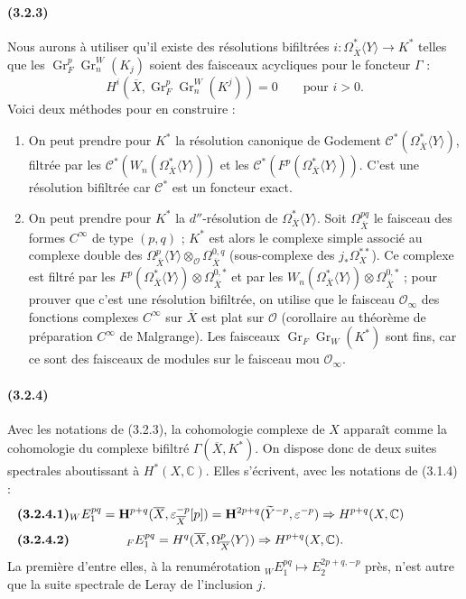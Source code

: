 \documentclass[10pt]{article}
\newcommand{\C}{\mathbb C}
\newcommand{\Gr}{\operatorname{Gr}}
\begin{document}
\paragraph{(3.2.3)} Nous aurons à utiliser qu'il existe des résolutions bifiltrées $i:\Omega_{\overline X}^{*}\langle Y\rangle\longrightarrow K^*$ telles que les $\Gr_F^p\Gr_n^W(K_j)$ soient des faisceaux acycliques pour le foncteur $\Gamma$ :
\[
H^i(\overline X,\Gr_F^p\Gr_n^W(K^j))=0\qquad \text{pour }i>0.
\]
Voici deux méthodes pour en construire :
\begin{enumerate}[label=\textit{\alph*)}]
\item On peut prendre pour $K^*$ la résolution canonique de Godement $\mathcal C^*(\Omega_{\overline X}^{*}\langle Y\rangle)$, filtrée par les $\mathcal C^*(W_n(\Omega_{\overline X}^{*}\langle Y\rangle))$ et les $\mathcal C^*(F^p(\Omega_{\overline X}^{*}\langle Y\rangle))$. C'est une résolution bifiltrée car $\mathcal C^*$ est un foncteur exact.
\item On peut prendre pour $K^*$ la $d''$-résolution de $\Omega_{\overline X}^{*}\langle Y\rangle$. Soit $\Omega_{\overline X}^{pq}$ le faisceau des formes $C^\infty$ de type $(p,q)$ ; $K^*$ est alors le complexe simple associé au complexe double des $\Omega_{\overline X}^{p}\langle Y\rangle\otimes_{\mathcal O}\Omega_{\overline X}^{0,q}$ (sous-complexe des $j_*\Omega_X^{**}$). Ce complexe est filtré par les $F^p(\Omega_{\overline X}^{*}\langle Y\rangle)\otimes\Omega_{\overline X}^{0,*}$ et par les $W_n(\Omega_{\overline X}^{*}\langle Y\rangle)\otimes\Omega_{\overline X}^{0,*}$ ; pour prouver que c'est une résolution bifiltrée, on utilise que le faisceau $\mathcal O_\infty$ des fonctions complexes $C^\infty$ sur $\overline X$ est plat sur $\mathcal O$ (corollaire au théorème de préparation $C^\infty$ de Malgrange). Les faisceaux $\Gr_F\Gr_W(K^*)$ sont fins, car ce sont des faisceaux de modules sur le faisceau mou $\mathcal O_\infty$.
\end{enumerate}

\paragraph{(3.2.4)} Avec les notations de (3.2.3), la cohomologie complexe de $X$ apparaît comme la cohomologie du complexe bifiltré $\Gamma(\overline X,K^*)$. On dispose donc de deux suites spectrales aboutissant à $H^*(X,\C)$. Elles s'écrivent, avec les notations de (3.1.4) :
\[
\makebox[\textwidth][s]{\textbf{(3.2.4.1)}\hfill$\displaystyle {}_W E_1^{pq}=\mathbf H^{p+q}(\overline X,\varepsilon_{\overline X}^{-p}[p])=\mathbf H^{2p+q}(\widetilde Y^{-p},\varepsilon^{-p})\Rightarrow H^{p+q}(X,\C)$\hfill\phantom{\textbf{(3.2.4.1)}}}
\]
\[
\makebox[\textwidth][s]{\textbf{(3.2.4.2)}\hfill$\displaystyle {}_F E_1^{pq}=H^q(\overline X,\Omega_{\overline X}^p\langle Y\rangle)\Rightarrow H^{p+q}(X,\C).$\hfill\phantom{\textbf{(3.2.4.2)}}}
\]
La première d'entre elles, à la renumérotation ${}_W E_1^{pq}\mapsto E_2^{2p+q,-p}$ près, n'est autre que la suite spectrale de Leray de l'inclusion $j$.
\end{document}
